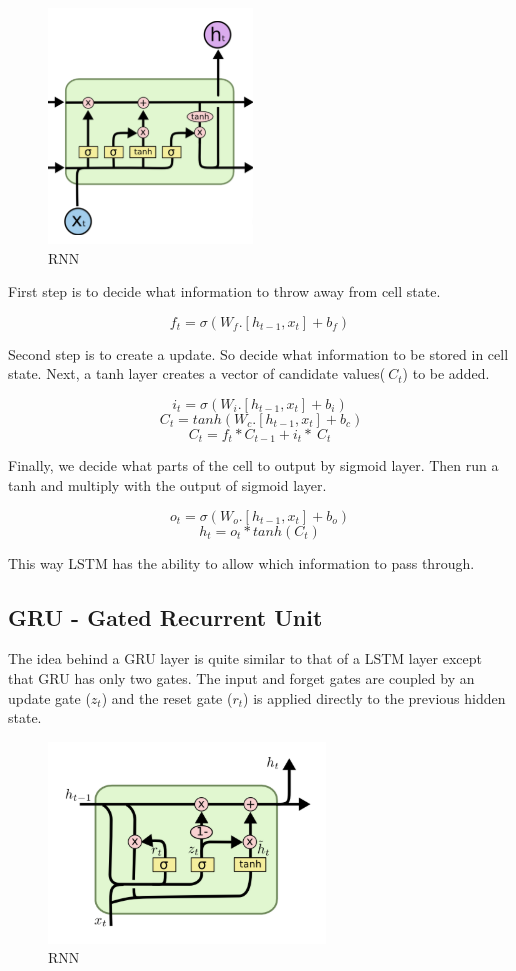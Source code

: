 \documentclass[runningheads]{llncs}
\begin{document}
\begin{figure}[h!]
\centering
        \includegraphics[width=0.5\linewidth]{plots/working_lstm.png}
    \caption{RNN}
\end{figure}

First step is to decide what information to throw away from cell state.

\[f_t = \sigma(W_f.[h_{t-1},x_t] + b_f) \]

Second step is to create a update. So decide what information to be stored in cell state. Next, a tanh layer creates a vector of candidate values($~C_t$) to be added.

\[i_t = \sigma(W_i.[h_{t-1},x_t] + b_i) \]
\[~C_t = tanh(W_c.[h_{t-1},x_t] + b_c) \]
\[C_t = f_t * C_{t-1} + i_t * ~C_t \]

Finally, we decide what parts of the cell to output by sigmoid layer. Then run a tanh and multiply with the output of sigmoid layer.

\[o_t = \sigma(W_o.[h_{t-1},x_t] + b_o) \]
\[ h_t = o_t * tanh(C_t)\]

This way LSTM has the ability to allow which information to pass through.
 
\subsection{GRU -  Gated Recurrent Unit}

The idea behind a GRU layer is quite similar to that of a LSTM layer except that GRU has only two gates. The input and forget gates are coupled by an update gate ($z_t$) and the reset gate ($r_t$) is applied directly to the previous hidden state.  

\begin{figure}[h!]
\centering
        \includegraphics[width=0.5\linewidth]{plots/working_gru.png}
    \caption{RNN}
\end{figure}
\end{document}

